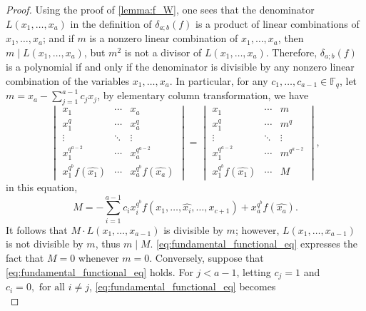 \documentclass[12pt,a4paper]{report}
\theoremstyle{definition}
\theoremstyle{remark}
\theoremstyle{definition}
\begin{document}
\begin{proof}
    Using the proof of \cref{lemma:f_W}, one sees that the denominator $L(x_1, \ldots, x_a)$ in the definition of $\delta_{a;b}(f)$ is a product of linear combinations of $x_1, \ldots, x_a$; and if $m$ is a nonzero linear combination of $x_1, \ldots, x_a$, then $m\mid L(x_1, \ldots, x_a)$, but $m^2$ is not a divisor of $L(x_1, \ldots, x_a)$. Therefore, $\delta_{a;b}(f)$ is a polynomial if and only if the denominator is divisible by any nonzero linear combination of the variables $x_1, \ldots, x_a$. In particular, for any $c_1, \ldots, c_{a-1}\in \mathbb{F}_q$, let $m = x_a - \sum\limits_{j=1}^{a-1}c_j x_j$, by elementary column transformation, we have 
\begin{equation}\label{eq:det_manip_fundamental_functional_eq}
    \begin{vmatrix}
            x_1 & \cdots & x_a\\
            x_1^q & \cdots & x_a^q\\
            \vdots & \ddots & \vdots\\
            x_1^{q^{a-2}} & \cdots  & x_a^{q^{a-2}}\\
            x_1^{q^b}f(\widehat{x_1}) & \cdots  & x_a^{q^b}f(\widehat{x_a})
        \end{vmatrix} = \begin{vmatrix}
            x_1 & \cdots & m\\
            x_1^q & \cdots & m^q\\
            \vdots & \ddots & \vdots\\
            x_1^{q^{a-2}} & \cdots  & m^{q^{a-2}}\\
            x_1^{q^b}f(\widehat{x_1}) & \cdots  & M
        \end{vmatrix},
\end{equation}
in this equation,
\begin{equation}\label{eq:bezout_functional}
    M=-\sum\limits_{i=1}^{a-1}c_i x_i^{q^b}f(x_1, \ldots, \widehat{x_i},\ldots, x_{c+1}) + x_{a}^{q^b}f(\widehat{x_a}).
\end{equation}
It follows that $M\cdot L(x_1, \ldots, x_{a-1})$ is divisible by $m$; however, $L(x_1, \ldots, x_{a-1})$ is not divisible by $m$, thus $m\mid M$. \eqref{eq:fundamental_functional_eq} expresses the fact that $M=0$ whenever $m=0$.\smallbreak
Conversely, suppose that \eqref{eq:fundamental_functional_eq} holds. For $j<a-1$, letting $c_j = 1$ and $c_i = 0, \text{ for all } i\neq j$, \eqref{eq:fundamental_functional_eq} becomes
\begin{equation*}

\end{equation*}
\end{proof}
\end{document}
